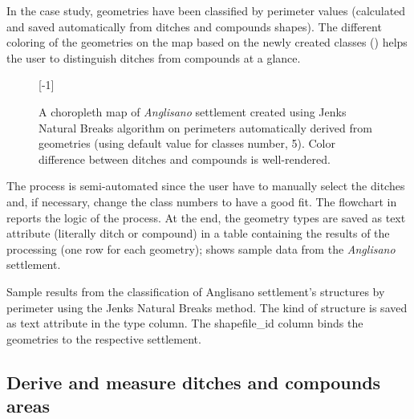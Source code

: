             In the case study, geometries have been classified by perimeter values (calculated and saved automatically from ditches and compounds shapes). The different coloring of the geometries on the map based on the newly created classes () helps the user to distinguish ditches from compounds at a glance.

            \begin{figure}[H]
                \centering
                \scalebox{1}[-1]{ %
                    \begin{tikzpicture}[x=1mm,y=1mm,scale=0.22]
                        
                    \end{tikzpicture}
                }
                \caption[A choropleth map of \emph{Anglisano} settlement using Jenks Natural Breaks]{A choropleth map of \emph{Anglisano} settlement created using Jenks Natural Breaks algorithm on perimeters automatically derived from geometries (using default value for classes number, 5). Color difference between ditches and compounds is well-rendered.}
                \label{fig:jenks-color}
            \end{figure}

            The process is semi-automated since the user have to manually select the ditches and, if necessary, change the class numbers to have a good fit. The flowchart in  reports the logic of the process. At the end, the geometry types are saved as text attribute (literally \textsf{ditch} or \textsf{compound}) in a table containing the results of the processing (one row for each geometry);  shows sample data from the \emph{Anglisano} settlement.

            \begin{table}[!htb]
                \centering
                
                \caption[Sample geometry classification results from Anglisano settlements using Jenk Natural Breaks method]{Sample results from the classification of Anglisano settlement's structures by perimeter using the Jenks Natural Breaks method. The kind of structure is saved as text attribute in the \textsf{type} column. The \textsf{shapefile\_id} column binds the geometries to the respective settlement.}
                \label{tab:jnb-results}
            \end{table}


            \pagebreak
        \subsection{Derive and measure ditches and compounds areas\label{sec:comp-area}}

